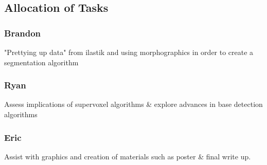 \documentclass[a4paper]{article}
\begin{document}
\subsection{Allocation of Tasks}
\subsubsection{Brandon}
"Prettying up data" from ilastik and using morphographics in order to create a segmentation algorithm
\subsubsection{Ryan}
Assess implications of supervoxel algorithms \& explore advances in base detection algorithms
\subsubsection{Eric}
Assist with graphics and creation of materials such as poster \& final write up.
\end{document}
